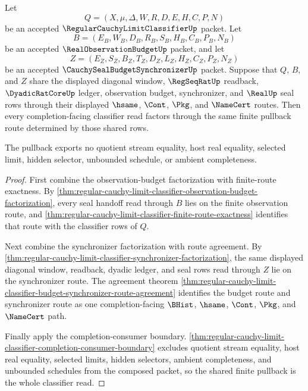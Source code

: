 \begin{theorem}
\label{thm:regular-cauchy-limit-classifier-budgeted-seal-pullback}
Let
$$
Q=(X,\mu,\Delta,W,R,D,E,H,C,P,N)
$$
be an accepted $\RegularCauchyLimitClassifierUp$ packet. Let
$$
B=(E_B,W_B,D_B,R_B,S_B,H_B,C_B,P_B,N_B)
$$
be an accepted $\RealObservationBudgetUp$ packet, and let
$$
Z=(E_Z,S_Z,B_Z,T_Z,D_Z,L_Z,H_Z,C_Z,P_Z,N_Z)
$$
be an accepted $\CauchySealBudgetSynchronizerUp$ packet. Suppose that $Q$, $B$, and $Z$ share the displayed diagonal window, $\RegSeqRatUp$ readback, $\DyadicRatCoreUp$ ledger, observation budget, synchronizer, and $\RealUp$ seal rows through their displayed $\hsame$, $\Cont$, $\Pkg$, and $\NameCert$ routes. Then every completion-facing classifier read factors through the same finite pullback route determined by those shared rows.

The pullback exports no quotient stream equality, host real equality, selected limit, hidden selector, unbounded schedule, or ambient completeness.
\end{theorem}
\begin{proof}
First combine the observation-budget factorization with finite-route exactness. By \autoref{thm:regular-cauchy-limit-classifier-observation-budget-factorization}, every seal handoff read through $B$ lies on the finite observation route, and \autoref{thm:regular-cauchy-limit-classifier-finite-route-exactness} identifies that route with the classifier rows of $Q$.

Next combine the synchronizer factorization with route agreement. By \autoref{thm:regular-cauchy-limit-classifier-synchronizer-factorization}, the same displayed diagonal window, readback, dyadic ledger, and seal rows read through $Z$ lie on the synchronizer route. The agreement theorem \autoref{thm:regular-cauchy-limit-classifier-budget-synchronizer-route-agreement} identifies the budget route and synchronizer route as one completion-facing $\BHist$, $\hsame$, $\Cont$, $\Pkg$, and $\NameCert$ path.

Finally apply the completion-consumer boundary. \autoref{thm:regular-cauchy-limit-classifier-completion-consumer-boundary} excludes quotient stream equality, host real equality, selected limits, hidden selectors, ambient completeness, and unbounded schedules from the composed packet, so the shared finite pullback is the whole classifier read.
\end{proof}


